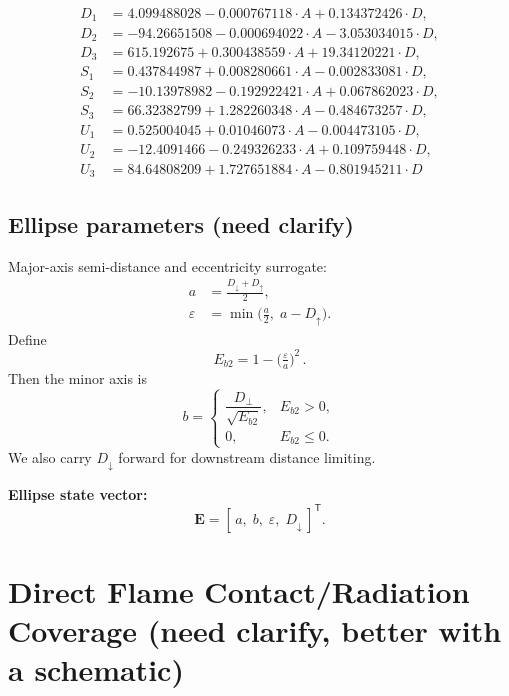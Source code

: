 \documentclass[a4paper,12pt]{article}
\begin{document}
\begin{align}
D_1&=4.099488028-0.000767118\cdot A+0.134372426\cdot D,\nonumber\\
D_2&=-94.26651508-0.000694022\cdot A-3.053034015\cdot D,\nonumber\\ D_3&=615.192675+0.300438559\cdot A+19.34120221\cdot D,\nonumber\\
S_1&=0.437844987+0.008280661\cdot A-0.002833081\cdot D,\nonumber\\
S_2&=-10.13978982-0.192922421\cdot A+0.067862023\cdot D,\nonumber\\
S_3&=66.32382799+1.282260348\cdot A-0.484673257\cdot D,\nonumber\\
U_1&=0.525004045+0.01046073\cdot A-0.004473105\cdot D,\nonumber\\
U_2&=-12.4091466-0.249326233\cdot A+0.109759448\cdot D,\nonumber\\
U_3&=84.64808209+1.727651884\cdot A-0.801945211\cdot D\nonumber
\end{align}

\subsection*{Ellipse parameters (need clarify)}

Major-axis semi-distance and eccentricity surrogate:
\begin{align}
a &= \frac{D_\downarrow + D_\uparrow}{2},\\
\varepsilon &= \min\!\Big(\tfrac{a}{2},\; a-D_\uparrow\Big).
\end{align}
Define
\begin{equation}
E_{b2}=1-\Big(\tfrac{\varepsilon}{a}\Big)^2\, .
\end{equation}
Then the minor axis is
\begin{equation}
b=\begin{cases}
\dfrac{D_\perp}{\sqrt{E_{b2}}}, & E_{b2}>0,\\[6pt]
0,& E_{b2}\le 0.
\end{cases}
\end{equation}
We also carry $D_\downarrow$ forward for downstream distance limiting.

\noindent\textbf{Ellipse state vector:}
\begin{equation}
\mathbf{E}=[\,a,\;b,\;\varepsilon,\;D_\downarrow\,]^{\mathsf T}.
\end{equation}

\section{Direct Flame Contact/Radiation Coverage  (need clarify, better with a schematic)} \label{heat_flux_calc_1}
\end{document}
